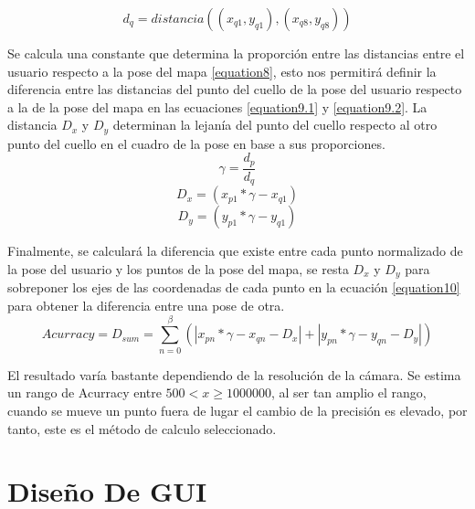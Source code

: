 \begin{equation}
d_q= distancia((x_{q1},y_{q1}),(x_{q8},y_{q8}))
\label{equation7.2}
\end{equation}

Se calcula una constante que determina la proporción entre las distancias entre el usuario respecto a la pose del mapa \ref{equation8}, esto nos permitirá definir la diferencia entre las distancias del punto del cuello de la pose del usuario respecto a la de la pose del mapa en las ecuaciones \ref{equation9.1} y \ref{equation9.2}. La distancia $D_x$ y $D_y$ determinan la lejanía del punto del cuello respecto al otro punto del cuello en el cuadro de la pose en base a sus proporciones.
\begin{equation}
\gamma = \frac{d_p}{d_q}
\label{equation8}
\end{equation}
\begin{equation}
D_x= (x_{p1}*\gamma - x_{q1})
\label{equation9.1}
\end{equation}
\begin{equation}
D_y= (y_{p1}*\gamma - y_{q1})
\label{equation9.2}
\end{equation}

Finalmente, se calculará la diferencia que existe entre cada punto normalizado de la pose del usuario y los puntos de la pose del mapa, se resta $D_x$ y $D_y$ para sobreponer los ejes de las coordenadas de cada punto en la ecuación \ref{equation10} para obtener la diferencia entre una pose de otra. 
\begin{equation}
Acurracy = D_{sum} = \sum_{n=0}^\beta (\left | x_{pn}*\gamma -x_{qn}-D_x \right |+\left | y_{pn}*\gamma -y_{qn}-D_y \right |) 
\label{equation10}
\end{equation}

El resultado varía bastante dependiendo de la resolución de la cámara. Se estima un rango de Acurracy entre $ 500 < x \geq 1000000$, al ser tan amplio el rango, cuando se mueve un punto fuera de lugar el cambio de la precisión es elevado, por tanto, este es el método de calculo seleccionado.






\section{Diseño De GUI}

